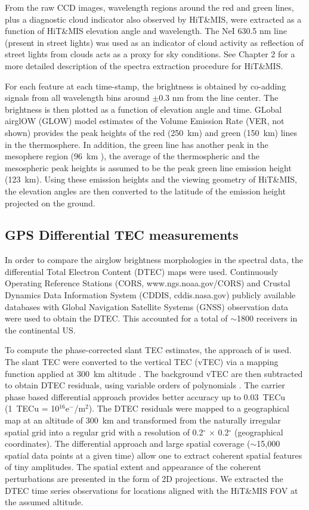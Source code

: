 \documentclass[crop=false,class=mitthesis,oneside,font=12pt]{standalone}
\begin{document}
From the raw CCD images, wavelength regions around the red and green lines, plus a diagnostic cloud indicator also observed by HiT\&MIS, were extracted as a function of HiT\&MIS elevation angle and wavelength.  The NeI 630.5 nm line (present in street lights) was used as an indicator of cloud activity as reflection of street lights from clouds acts as a proxy for sky conditions. See Chapter 2 for a more detailed description of the spectra extraction procedure for HiT\&MIS.

For each feature at each time-stamp, the brightness is obtained by co-adding signals from all wavelength bins around $\pm$0.3 nm from the line center. The brightness is then plotted as a function of elevation angle and time. GLobal airglOW (GLOW) \citep{solomon_1988,solomon1989630,bailey2002} model estimates of the Volume Emission Rate (VER, not shown) provides the peak heights of the red (250~km) and green (150~km) lines in the thermosphere. In addition, the green line has another peak in the mesophere region (96~km \citep{yee1987}), the average of the thermospheric and the mesospheric peak heights is assumed to be the peak green line emission height (123~km). Using these emission heights and the viewing geometry of HiT\&MIS, the elevation angles are then converted to the latitude of the emission height projected on the ground. 

\subsection{GPS Differential TEC measurements}
\label{tec}
In order to compare the airglow brightness morphologies in the spectral data, the differential Total Electron Content (DTEC) maps were used. Continuously Operating Reference Stations (CORS, www.ngs.noaa.gov/CORS) and Crustal Dynamics Data Information System (CDDIS, cddis.nasa.gov) publicly available databases with Global Navigation Satellite Systems (GNSS) observation data were used to obtain the DTEC. This accounted for a total of  $\sim$1800 receivers in the continental US. 

To compute the phase-corrected slant TEC estimates, the approach of \cite{Coster1992} is used. The slant TEC were converted to the vertical TEC (vTEC) via a mapping function applied at 300~km altitude \citep{Klobuchar1987}. The background vTEC are then subtracted to obtain DTEC residuals, using variable orders of polynomials \citep{Mrak2018}. The carrier phase based differential approach provides better accuracy up to 0.03~TECu \citep{Coster2012} (1~TECu = 10$^{16}$e$^-$/m$^2$). The DTEC residuals were mapped to a geographical map at an altitude of 300~km and transformed from the naturally irregular spatial grid into a regular grid \citep[e.g.,][]{Azeem2015, Mrak2018} with a resolution of 0.2$^\circ$ $\times$ 0.2$^\circ$ (geographical coordinates). The differential approach and large spatial coverage ($\sim$15,000 spatial data points at a given time) allow one to extract coherent spatial features of tiny amplitudes. The spatial extent and appearance of the coherent perturbations are presented in the form of 2D projections. We extracted the DTEC time series observations for locations aligned with the HiT\&MIS FOV at the assumed altitude. 
\end{document}
